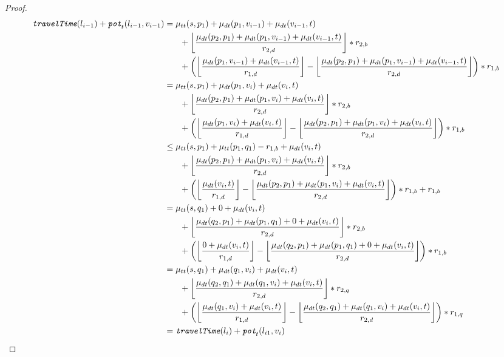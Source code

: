 \begin{proof}
	\begin{align}
		\begin{split}\label{eq:label_2_feasibility_proof_4}
			\concretett(l_{i-1}) + \concretepotential_t(l_{i-1},v_{i-1}) &= \traveltime(s, p_1) + \drivingtime(p_1,v_{i-1}) + \drivingtime(v_{i-1},t)\\
			& \phantom{{}=1} + \floor*{ \frac{\drivingtime(p_2,p_1) + \drivingtime(p_1,v_{i-1}) + \drivingtime(v_{i-1},t)}{\restr_{2,d}} } * \restr_{2,b}\\
			& \phantom{{}=1} + \left( \floor*{ \frac{\drivingtime(p_1,v_{i-1})  + \drivingtime(v_{i-1},t)}{\restr_{1,d}} } - \floor*{ \frac{\drivingtime(p_2,p_1) + \drivingtime(p_1,v_{i-1}) + \drivingtime(v_{i-1},t)}{\restr_{2,d}} }\right) * \restr_{1,b}\\
			&= \traveltime(s, p_1) + \drivingtime(p_1,v_{i}) + \drivingtime(v_{i},t)\\
			& \phantom{{}=1} + \floor*{ \frac{\drivingtime(p_2,p_1) + \drivingtime(p_1,v_{i}) + \drivingtime(v_{i},t)}{\restr_{2,d}} } * \restr_{2,b}\\
			& \phantom{{}=1} + \left( \floor*{ \frac{\drivingtime(p_1,v_{i})  + \drivingtime(v_{i},t)}{\restr_{1,d}} } - \floor*{ \frac{\drivingtime(p_2,p_1) + \drivingtime(p_1,v_{i}) + \drivingtime(v_{i},t)}{\restr_{2,d}} }\right) * \restr_{1,b}\\
			&\le \traveltime(s, p_1) + \traveltime(p_1,q_1) - r_{1,b} + \drivingtime(v_{i},t)\\
			& \phantom{{}=1} + \floor*{ \frac{\drivingtime(p_2,p_1) + \drivingtime(p_1,v_{i}) + \drivingtime(v_{i},t)}{\restr_{2,d}} } * \restr_{2,b}\\
			& \phantom{{}=1} + \left( \floor*{ \frac{\drivingtime(v_{i},t)}{\restr_{1,d}} } - \floor*{ \frac{\drivingtime(p_2,p_1) + \drivingtime(p_1,v_{i}) + \drivingtime(v_{i},t)}{\restr_{2,d}} }\right) * \restr_{1,b} + r_{1,b}\\
			&= \traveltime(s, q_1) + 0 + \drivingtime(v_{i},t)\\
			& \phantom{{}=1} + \floor*{ \frac{\drivingtime(q_2,p_1) + \drivingtime(p_1,q_{1}) + 0 + \drivingtime(v_{i},t)}{\restr_{2,d}} } * \restr_{2,b}\\
			& \phantom{{}=1} + \left( \floor*{ \frac{0 + \drivingtime(v_{i},t)}{\restr_{1,d}} } - \floor*{ \frac{\drivingtime(q_2,p_1) + \drivingtime(p_1,q_{1}) + 0 + \drivingtime(v_{i},t)}{\restr_{2,d}} }\right) * \restr_{1,b}\\
			&= \traveltime(s, q_1) + \drivingtime(q_1,v_{i}) + \drivingtime(v_{i},t)\\
			& \phantom{{}=1} + \floor*{ \frac{\drivingtime(q_2,q_1) + \drivingtime(q_1,v_{i}) + \drivingtime(v_{i},t)}{\restr_{2,d}} } * \restr_{2,q}\\
			& \phantom{{}=1} + \left( \floor*{ \frac{\drivingtime(q_1,v_{i})  + \drivingtime(v_{i},t)}{\restr_{1,d}} } - \floor*{ \frac{\drivingtime(q_2,q_1) + \drivingtime(q_1,v_{i}) + \drivingtime(v_{i},t)}{\restr_{2,d}} }\right) * \restr_{1,q}\\
			&= \concretett(l_{i}) + \concretepotential_t(l_{i1},v_{i})
		\end{split}
	\end{align}


\end{proof}
